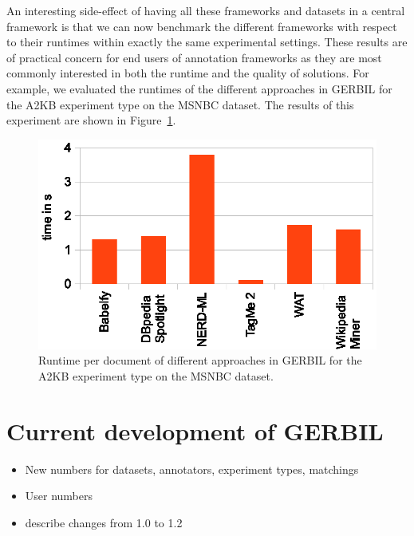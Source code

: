 An interesting side-effect of having all these frameworks and datasets in a central framework is that we can now benchmark the different frameworks with respect to their runtimes within exactly the same experimental settings. These results are of practical concern for end users of annotation frameworks as they are most commonly interested in both the runtime and the quality of solutions. For example, we evaluated the runtimes of the different approaches in GERBIL for the A2KB experiment type on the MSNBC dataset. The results of this experiment are shown in Figure~\ref{fig:runtime}.


\begin{figure}[tb!]
\centering
\includegraphics[width=\columnwidth]{part_02/benchmarking/WWW_GERBIL/needed_times.eps}
\caption{Runtime per document of different approaches in GERBIL for the A2KB experiment type on the MSNBC dataset.}
\label{fig:runtime}
\end{figure}

\section{Current development of GERBIL}
\label{sec:currentNumbersForGERBIL}
\begin{itemize}
\item New numbers for datasets, annotators, experiment types, matchings
\item User numbers
\item describe changes from 1.0 to 1.2
\end{itemize}


